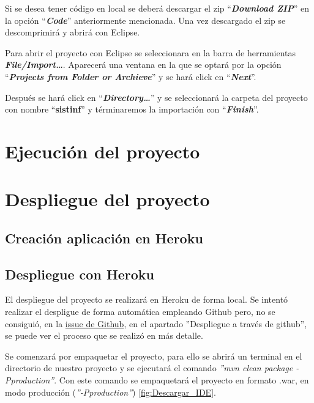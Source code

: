 
Si se desea tener código en local se deberá descargar el zip ``\textbf{\textit{Download ZIP}}'' en la opción ``\textbf{\textit{Code}}'' anteriormente mencionada. Una vez descargado el zip se descomprimirá y abrirá con Eclipse. 

Para abrir el proyecto con Eclipse se seleccionara en la barra de herramientas \textbf{\textit{File/Import\dots}}. Aparecerá una ventana en la que se optará por la opción ``\textbf{\textit{Projects from Folder or Archieve}}'' y se hará click en ``\textbf{\textit{Next}}''.

Después se hará click en ``\textbf{\textit{Directory\dots}}'' y se seleccionará la carpeta del proyecto con nombre ``\textbf{sistinf}'' y términaremos la importación con ``\textbf{\textit{Finish}}''.
	
\section{Ejecución del proyecto}

\section{Despliegue del proyecto}

\subsection{Creación aplicación en Heroku}

\subsection{Despliegue con Heroku}

El despliegue del proyecto se realizará en Heroku de forma local. Se intentó realizar el despligue de forma automática empleando Github pero, no se consiguió, en la \href{https://github.com/dbo1001/Gestor-TFG-2021/issues/112}{issue de Github}, en el apartado ''Despliegue a través de github'', se puede ver el proceso que se realizó en más detalle.

Se comenzará por empaquetar el proyecto, para ello se abrirá un terminal en el directorio de nuestro proyecto y se ejecutará el comando \emph{''mvn clean package -Pproduction''}. Con este comando se empaquetará el proyecto en formato .war, en modo producción (\emph{''-Pproduction''}) \ref{fig:Descargar_IDE}.

